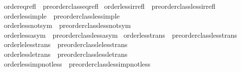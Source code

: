 \begin{isabellebody}
\isanewline
{}\isamarkupfalse%
\ order{\isacharunderscore}{\kern0pt}eq{\isacharunderscore}{\kern0pt}refl\ {\isacharequal}{\kern0pt}\ preorder{\isacharunderscore}{\kern0pt}class{\isachardot}{\kern0pt}eq{\isacharunderscore}{\kern0pt}refl\isanewline
{}\isamarkupfalse%
\ order{\isacharunderscore}{\kern0pt}less{\isacharunderscore}{\kern0pt}irrefl\ {\isacharequal}{\kern0pt}\ preorder{\isacharunderscore}{\kern0pt}class{\isachardot}{\kern0pt}less{\isacharunderscore}{\kern0pt}irrefl\isanewline
{}\isamarkupfalse%
\ order{\isacharunderscore}{\kern0pt}less{\isacharunderscore}{\kern0pt}imp{\isacharunderscore}{\kern0pt}le\ {\isacharequal}{\kern0pt}\ preorder{\isacharunderscore}{\kern0pt}class{\isachardot}{\kern0pt}less{\isacharunderscore}{\kern0pt}imp{\isacharunderscore}{\kern0pt}le\isanewline
{}\isamarkupfalse%
\ order{\isacharunderscore}{\kern0pt}less{\isacharunderscore}{\kern0pt}not{\isacharunderscore}{\kern0pt}sym\ {\isacharequal}{\kern0pt}\ preorder{\isacharunderscore}{\kern0pt}class{\isachardot}{\kern0pt}less{\isacharunderscore}{\kern0pt}not{\isacharunderscore}{\kern0pt}sym\isanewline
{}\isamarkupfalse%
\ order{\isacharunderscore}{\kern0pt}less{\isacharunderscore}{\kern0pt}asym\ {\isacharequal}{\kern0pt}\ preorder{\isacharunderscore}{\kern0pt}class{\isachardot}{\kern0pt}less{\isacharunderscore}{\kern0pt}asym\isanewline
{}\isamarkupfalse%
\ order{\isacharunderscore}{\kern0pt}less{\isacharunderscore}{\kern0pt}trans\ {\isacharequal}{\kern0pt}\ preorder{\isacharunderscore}{\kern0pt}class{\isachardot}{\kern0pt}less{\isacharunderscore}{\kern0pt}trans\isanewline
{}\isamarkupfalse%
\ order{\isacharunderscore}{\kern0pt}le{\isacharunderscore}{\kern0pt}less{\isacharunderscore}{\kern0pt}trans\ {\isacharequal}{\kern0pt}\ preorder{\isacharunderscore}{\kern0pt}class{\isachardot}{\kern0pt}le{\isacharunderscore}{\kern0pt}less{\isacharunderscore}{\kern0pt}trans\isanewline
{}\isamarkupfalse%
\ order{\isacharunderscore}{\kern0pt}less{\isacharunderscore}{\kern0pt}le{\isacharunderscore}{\kern0pt}trans\ {\isacharequal}{\kern0pt}\ preorder{\isacharunderscore}{\kern0pt}class{\isachardot}{\kern0pt}less{\isacharunderscore}{\kern0pt}le{\isacharunderscore}{\kern0pt}trans\isanewline
{}\isamarkupfalse%
\ order{\isacharunderscore}{\kern0pt}less{\isacharunderscore}{\kern0pt}imp{\isacharunderscore}{\kern0pt}not{\isacharunderscore}{\kern0pt}less\ {\isacharequal}{\kern0pt}\ preorder{\isacharunderscore}{\kern0pt}class{\isachardot}{\kern0pt}less{\isacharunderscore}{\kern0pt}imp{\isacharunderscore}{\kern0pt}not{\isacharunderscore}{\kern0pt}less\isanewline

\end{isabellebody}
